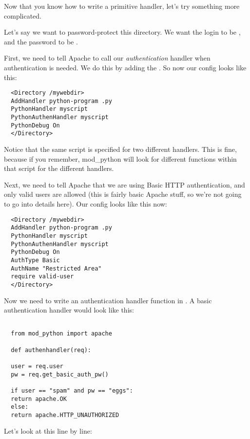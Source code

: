 Now that you know how to write a primitive handler, let's try
something more complicated.

Let's say we want to password-protect this directory. We want the
login to be , and the password to be .

First, we need to tell Apache to call our \emph{authentication}
handler when authentication is needed. We do this by adding the
. So now our config looks like this:

\begin{verbatim}
  <Directory /mywebdir>
  AddHandler python-program .py
  PythonHandler myscript
  PythonAuthenHandler myscript
  PythonDebug On
  </Directory>
\end{verbatim}

Notice that the same script is specified for two different
handlers. This is fine, because if you remember, mod_python will look
for different functions within that script for the different handlers.

Next, we need to tell Apache that we are using Basic HTTP
authentication, and only valid users are allowed (this is fairly basic
Apache stuff, so we're not going to go into details here). Our config
looks like this now:

\begin{verbatim}
  <Directory /mywebdir>
  AddHandler python-program .py
  PythonHandler myscript
  PythonAuthenHandler myscript
  PythonDebug On
  AuthType Basic
  AuthName "Restricted Area"
  require valid-user
  </Directory>
\end{verbatim}          

Now we need to write an authentication handler function in
. A basic authentication handler would look like
this:

\begin{verbatim}

  from mod_python import apache

  def authenhandler(req):

  user = req.user
  pw = req.get_basic_auth_pw()

  if user == "spam" and pw == "eggs":
  return apache.OK
  else:
  return apache.HTTP_UNAUTHORIZED
\end{verbatim}  

Let's look at this line by line: 

